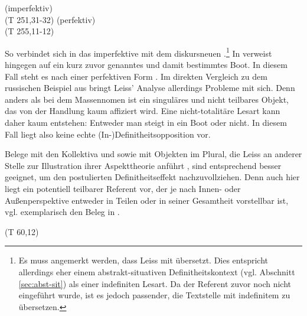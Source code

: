 \begin{exe}
	\ex \label{ex:gi-stigan}   
	\begin{xlist}
		\ex \label{ex:stigan}   (imperfektiv) \\ 
		 (T 251,31-32)
		\ex \label{ex:gistigan}   (perfektiv) \\   (T 255,11-12)
		\end{xlist}
\end{exe}
\noindent
So verbindet sich in  das imperfektive   mit dem diskursneuen .\footnote{Es muss angemerkt werden, dass Leiss  mit  übersetzt. Dies entspricht allerdings eher einem abstrakt-situativen Definitheitskontext (vgl. Abschnitt \ref{sec:abst-sit}) als einer indefiniten Lesart. Da der Referent zuvor noch nicht eingeführt wurde, ist es jedoch passender, die Textstelle mit indefinitem  zu übersetzen.} In  verweist  hingegen auf ein kurz zuvor genanntes und damit bestimmtes Boot. In diesem Fall steht es nach einer perfektiven Form .
Im direkten Vergleich zu dem russischen Beispiel aus  bringt Leiss' Analyse allerdings Probleme mit sich. Denn anders als bei dem Massennomen  ist  ein singuläres und nicht teilbares Objekt, das von der Handlung  kaum affiziert wird. Eine nicht-totalitäre Lesart kann daher kaum entstehen: Entweder man steigt in ein Boot oder nicht. In diesem Fall liegt also keine echte (In-)Definitheitsopposition vor. 

Belege mit den Kollektiva   und   sowie mit Objekten im Plural, die Leiss an anderer Stelle zur Illustration ihrer Aspekttheorie anführt \parencite[170ff.]{Leiss2000}, sind entsprechend besser geeignet, um den postulierten Definitheitseffekt nachzuvollziehen. Denn auch hier liegt ein potentiell teilbarer Referent vor, der je nach Innen- oder Außenperspektive entweder in Teilen oder in seiner Gesamtheit vorstellbar ist, vgl. exemplarisch den Beleg in  \parencite[170]{Leiss2000}. 


\begin{exe}
	\ex \label{ex:menigi}   (T 60,12)\\ 	
\end{exe}

